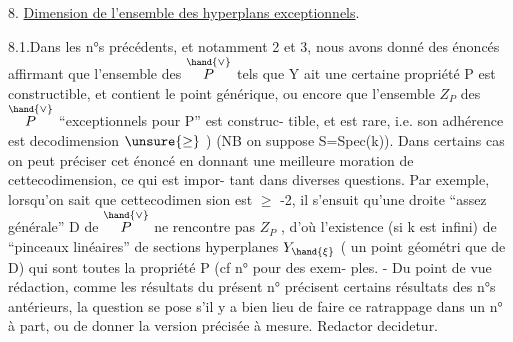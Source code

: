
8. \uline{Dimension de l'ensemble des hyperplans exceptionnels}.

8.1.Dans les n°s précédents, et notamment 2 et 3, nous avons donné des
énoncés affirmant que l'ensemble des \hand{$\xi\in$} $\overset{\hand{\vee}}{P}$ tels que Y ait une certaine
propriété P est constructible, et contient le point générique\unsure{$\overset{\vee}{\ }$}\hand{/},  ou
encore que l'ensemble $Z_P$ des \hand{$\xi\in$} $\overset{\hand{\vee}}{P}$ ``exceptionnels pour P'' est construc-%
tible, et est rare, i.e. son adhérence est decodimension $\unsure{\geq}$ ) 
(NB on suppose S=Spec(k)). Dans certains cas on peut préciser cet énoncé
en donnant une meilleure moration de cettecodimension, ce qui est impor-%
tant dans diverses questions. Par exemple, lorsqu'on sait que cettecodimen
sion est $\geq$ -2, il s'ensuit qu'une droite ``assez générale'' D de $\overset{\hand{\vee}}{P}$
ne rencontre pas $Z_P$ , d'où l'existence (si k est infini) de ``pinceaux
linéaires'' de sections hyperplanes  $Y_{\hand{\xi}}$ (\hand{$\xi$} un point géométri
que de D) qui sont toutes la propriété P (cf n°  pour des exem-%
ples. - Du point de vue rédaction, comme les résultats du présent n°
précisent certains résultats des n°s antérieurs, la question se pose s'il
y a bien lieu de faire ce ratrappage dans un n° à part, ou de donner la
version précisée à mesure. Redactor decidetur.



